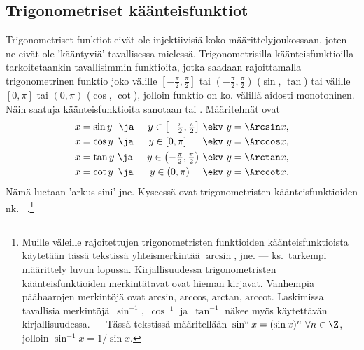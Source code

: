 \subsection{Trigonometriset käänteisfunktiot}

Trigonometriset funktiot eivät ole injektiivisiä koko määrittelyjoukossaan, joten ne eivät ole 
'kääntyviä' tavallisessa mielessä. Trigonometrisilla käänteisfunktioilla tarkoitetaankin 
tavallisimmin funktioita, jotka saadaan rajoittamalla trigonometrinen funktio joko välille 
$[-\frac{\pi}{2},\frac{\pi}{2}]$ tai $(-\frac{\pi}{2},\frac{\pi}{2})$ ($\sin$, $\tan$) tai 
välille $[0,\pi]$ tai $(0,\pi)$ ($\cos$, $\cot$), jolloin funktio on ko. välillä aidosti 
monotoninen. Näin saatuja käänteisfunktioita sanotaan
 tai . Määritelmät ovat
\begin{alignat*}{2}
x&=\sin y\ \ \ja \ &y \in \left[-\tfrac{\pi}{2},\tfrac{\pi}{2}\right] \ & \ekv\ y=\Arcsin x, \\
x&=\cos y\,\ \ja \ &y \in \left[0,\pi\right]\quad\ \ & \ekv \ y=\Arccos x, \\
x&=\tan y \ \ja \ &y \in \left(-\tfrac{\pi}{2},\tfrac{\pi}{2}\right) \ & \ekv\ y=\Arctan x, \\
x&=\cot y\,\ \ja \ &y \in \left(0,\pi\right)\quad\ & \ekv \ y=\Arccot x.
\end{alignat*}
Nämä luetaan 'arkus sini' jne. Kyseessä ovat trigonometristen käänteisfunktioiden nk.\
%
.\footnote[2]{ Muille väleille rajoitettujen trigonometristen funktioiden 
käänteisfunktioista käytetään tässä tekstissä yhteismerkintää $\arcsin$, jne. --- ks.\ tarkempi
määrittely luvun lopussa. Kirjallisuudessa trigonometristen käänteisfunktioiden merkintätavat
ovat hieman kirjavat. Vanhempia päähaarojen merkintöjä ovat $\overline{\text{arc}}$sin, 
$\overline{\text{arc}}$cos, $\overline{\text{arc}}$tan, $\overline{\text{arc}}$cot. Laskimissa
tavallisia merkintöjä $\,\sin^{-1}$, $\,\cos^{-1}$ ja $\,\tan^{-1}$ näkee myös käytettävän 
kirjallisuudessa. --- Tässä tekstissä määritellään $\,\sin^n x=(\sin x)^n\ \forall n\in\Z$,
jolloin $\sin^{-1}x=1/\sin x$.}

